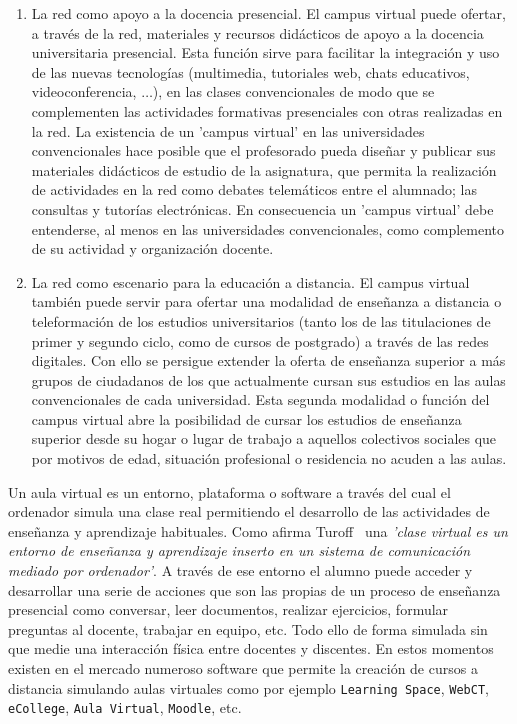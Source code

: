 \begin{enumerate}
\item	La red como apoyo a la docencia presencial. El campus virtual puede ofertar, a través de la red, materiales y recursos didácticos de apoyo a la docencia universitaria presencial. Esta función sirve para facilitar la integración y uso de las nuevas tecnologías (multimedia, tutoriales web, chats educativos, videoconferencia, $\ldots$), en las clases convencionales de modo que se complementen las actividades formativas presenciales con otras realizadas en la red. La existencia de un 'campus virtual' en las universidades convencionales hace posible que el profesorado pueda diseñar y publicar sus materiales didácticos de estudio de la asignatura, que permita la realización de actividades en la red como debates telemáticos entre el alumnado; las consultas y tutorías electrónicas. En consecuencia un 'campus virtual' debe entenderse, al menos en las universidades convencionales, como complemento de su actividad y organización docente.
\item	La red como escenario para la educación a distancia. El campus virtual también puede servir para ofertar una modalidad de enseñanza a distancia o teleformación de los estudios universitarios (tanto los de las titulaciones de primer y segundo ciclo, como de cursos de postgrado) a través de las redes digitales. Con ello se persigue extender la oferta de enseñanza superior a más grupos de ciudadanos de los que actualmente cursan sus estudios en las aulas convencionales de cada universidad. Esta segunda modalidad o función del campus virtual abre la posibilidad de cursar los estudios de enseñanza superior desde su hogar o lugar de trabajo a aquellos colectivos sociales que por motivos de edad, situación profesional o residencia no acuden a las aulas.
\end{enumerate}

Un aula virtual es un entorno, plataforma o software a través del cual el ordenador simula una clase real permitiendo el desarrollo de las actividades de enseñanza y aprendizaje habituales. Como afirma Turoff~\cite{turoff95} una \emph{'clase virtual es un entorno de enseñanza y aprendizaje inserto en un sistema de comunicación mediado por ordenador'}. A través de ese entorno el alumno puede acceder y desarrollar una serie de acciones que son las propias de un proceso de enseñanza presencial como conversar, leer documentos, realizar ejercicios, formular preguntas al docente, trabajar en equipo, etc. Todo ello de forma simulada sin que medie una interacción física entre docentes y discentes. En estos momentos existen en el mercado numeroso software que permite la creación de cursos a distancia simulando aulas virtuales como por ejemplo \texttt{Learning Space}, \texttt{WebCT}, \texttt{eCollege}, \texttt{Aula Virtual}, \texttt{Moodle}, etc.

